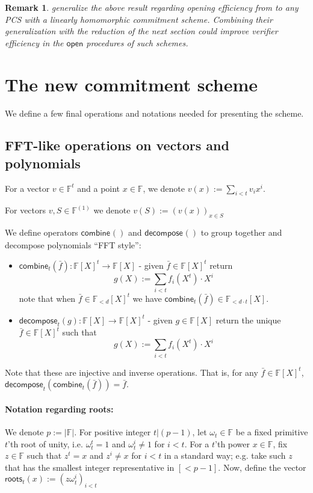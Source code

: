\documentclass[11pt]{article} %
\newcommand{\F}{\ensuremath{\mathbb F}\xspace}
\newcommand{\vecc}[2]{\ensuremath{(#1)_{#2}}\xspace}
\newcommand{\open}{\ensuremath{\mathsf{open}}\xspace}
\newcommand{\defeq}{:=}
\newcommand{\polysofdeg}[1]{\ensuremath{\F_{< #1}[X]}\xspace}
\newtheorem{remark}[lemma]{Remark}
\newcommand{\polys}{\ensuremath{\mathbb{F}[X]}\xspace}
\newcommand{\lt}[1]{\ensuremath{ [ {\scriptscriptstyle <} #1]}\xspace}
\newcommand{\combine}[2]{\ensuremath{\mathsf{combine}_{#1}(#2)}\xspace}
\newcommand{\eval}[2]{\ensuremath{#1(#2)}\xspace}%
\newcommand{\decompose}[2]{\ensuremath{\mathsf{decompose}_{#1}(#2)}\xspace}
\newcommand{\roots}[2]{\ensuremath{\mathsf{roots}_{#1}(#2)}\xspace}
\newcommand{\f}{\ensuremath{\bar{f}}\xspace}
\newcommand{\vecs}{{\ensuremath{\F^{(1)}}}\xspace}
\newcommand{\prg}[1]{ \paragraph{\textbf{#1}}}
\newcommand{\sumi}[1]{\sum_{i<#1}}
\begin{document}
\begin{remark}\label{rem:haloinfinite}
\cite{haloinfinite} generalize the above result regarding opening efficiency from \cite{kate} to any PCS with a linearly homomorphic commitment scheme.
Combining their generalization with the reduction of the next section could improve verifier efficiency in the \open procedures of such schemes.
 
\end{remark}

\section{The new commitment scheme}\label{sec:newPCS}
We define a few final operations and notations needed for presenting the scheme.
\subsection{FFT-like operations on vectors and polynomials}\label{sec:newPCS}
For a vector $v\in \F^t$ and a point $x\in \F$, we denote $\eval{v}{x}\defeq \sumi{t} v_ix^i$.

For vectors $v,S \in \vecs$ we denote $\eval{v}{S}\defeq \vecc{\eval{v}{x}}{x\in S}$

We define operators \combine{}{} and \decompose{}{} to group together and decompose polynomials ``FFT style'':
\begin{itemize}
 \item 
$\combine{t}{\f}:\polys^t\to \polys$ - given $\f\in \polys^t$ return
\[g(X)\defeq \sumi{t} f_i(X^t)\cdot X^i\]
note that when $\f\in \polysofdeg{d}^t$ we have $\combine{t}{\f}\in \polysofdeg{d\cdot t}$.
\item
$\decompose{t}{g}:\polys\to \polys^t$ - given $g\in \polys$ return 
the unique $\f\in \polys^t$ such that 
\[g(X)\defeq \sumi{t} f_i(X^t)\cdot X^i\]


\end{itemize}


Note that these are injective and inverse operations. That is, for any $\f\in\polys^t$, $\decompose{t}{\combine{t}{\f}}=\f$.

\prg{Notation regarding roots:}
We denote $p\defeq |\F|$. For positive integer $t|(p-1)$, let $\omega_t\in \F$ be a fixed primitive $t$'th root of 
unity, i.e. $\omega_t^t=1$ and $\omega_t^i\neq 1$ for $i<t$.
For a $t$'th power $x\in \F$, fix $z\in \F$ such that $z^t=x$ and $z^i\neq x$ for $i<t$ in a standard way; e.g. take such $z$ that has the smallest integer representative in \lt{p-1}. Now, define the vector 
$\roots{t}{x}\defeq \vecc{z\omega_t^i}{i<t}$
\end{document}
